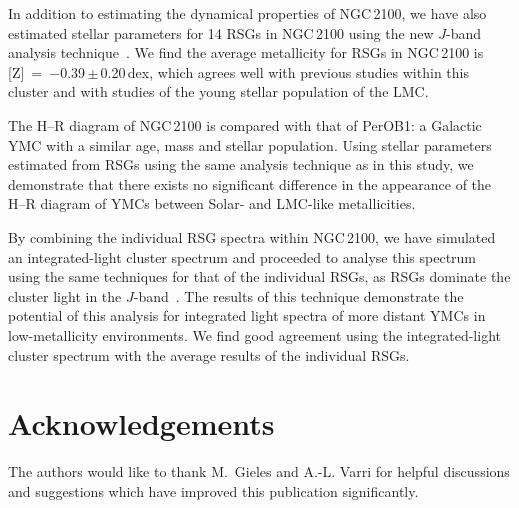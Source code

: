 \documentclass[useAMS,usenatbib]{mn2e}
\begin{document}
In addition to estimating the dynamical properties of NGC\,2100, we have also %
estimated stellar parameters for 14 RSGs in NGC\,2100 using the new $J$-band analysis technique~\citep{2010MNRAS.407.1203D}.
We find the average metallicity for RSGs in NGC\,2100 is [Z]~=~$-$0.39\,$\pm$\,0.20\,dex, which agrees well with previous studies within this cluster and with studies of the young stellar population of the LMC.

The H--R diagram of NGC\,2100 is compared with that of PerOB1: a Galactic YMC with a similar age, mass and stellar population.
Using stellar parameters estimated from RSGs using the same analysis technique as in this study, we demonstrate that there exists no significant difference in the appearance of the H--R diagram of YMCs between Solar- and LMC-like metallicities.


By combining the individual RSG spectra within NGC\,2100, we have simulated an integrated-light cluster spectrum and proceeded to analyse this spectrum using the same techniques for that of the individual RSGs, as RSGs dominate the cluster light in the $J$-band~\citep{2013MNRAS.430L..35G}.
The results of this technique demonstrate the potential of this analysis for integrated light spectra of more distant YMCs in low-metallicity environments.
We find good agreement using the integrated-light cluster spectrum with the average results of the individual RSGs.

\section*{Acknowledgements}
The authors would like to thank M.~Gieles and A.-L. Varri for helpful discussions and suggestions which have improved this publication significantly.


% 
\end{document}
